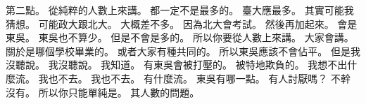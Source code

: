 \hypertarget{c01:cue:4042}{}第二點。
\hypertarget{c01:cue:4043}{}從純粹的人數上來講。
\hypertarget{c01:cue:4044}{}都一定不是最多的。
\hypertarget{c01:cue:4045}{}臺大應最多。
\hypertarget{c01:cue:4046}{}其實可能我猜想。
\hypertarget{c01:cue:4047}{}可能政大跟北大。
\hypertarget{c01:cue:4048}{}大概差不多。
\hypertarget{c01:cue:4049}{}因為北大會考試。
\hypertarget{c01:cue:4050}{}然後再加起來。
\hypertarget{c01:cue:4051}{}會是東吳。
\hypertarget{c01:cue:4052}{}東吳也不算少。
\hypertarget{c01:cue:4053}{}但是不會是多的。
\hypertarget{c01:cue:4054}{}所以你要從人數上來講。
\hypertarget{c01:cue:4055}{}大家會講。
\hypertarget{c01:cue:4056}{}關於是哪個學校畢業的。
\hypertarget{c01:cue:4057}{}或者大家有種共同的。
\hypertarget{c01:cue:4058}{}所以東吳應該不會佔平。
\hypertarget{c01:cue:4059}{}但是我沒聽說。
\hypertarget{c01:cue:4060}{}我沒聽說。
\hypertarget{c01:cue:4061}{}我知道。
\hypertarget{c01:cue:4062}{}有東吳會被打壓的。
\hypertarget{c01:cue:4063}{}被特地欺負的。
\hypertarget{c01:cue:4064}{}我想不出什麼流。
\hypertarget{c01:cue:4065}{}我也不去。
\hypertarget{c01:cue:4066}{}我也不去。
\hypertarget{c01:cue:4067}{}有什麼流。
\hypertarget{c01:cue:4068}{}東吳有哪一點。
\hypertarget{c01:cue:4069}{}有人討厭嗎？
\hypertarget{c01:cue:4070}{}不幹沒有。
\hypertarget{c01:cue:4071}{}所以你只能單純是。
\hypertarget{c01:cue:4072}{}其人數的問題。

